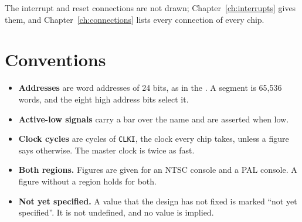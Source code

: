 The interrupt and reset connections are not drawn; Chapter~\ref{ch:interrupts} gives them, and
Chapter~\ref{ch:connections} lists every connection of every chip.

\section{Conventions}

\begin{itemize}
	\item \textbf{Addresses} are word addresses of 24 bits, as in the \hwmanual{}. A segment is 65,536 words, and the
	      eight high address bits select it.
	\item \textbf{Active-low signals} carry a bar over the name and are asserted when low.
	\item \textbf{Clock cycles} are cycles of \texttt{CLKI}, the clock every chip takes, unless a figure says otherwise.
	      The master clock is twice as fast.
	\item \textbf{Both regions.} Figures are given for an NTSC console and a PAL console. A figure without a region
	      holds for both.
	\item \textbf{Not yet specified.} A value that the design has not fixed is marked ``not yet specified''. It is not
	      undefined, and no value is implied.
\end{itemize}

